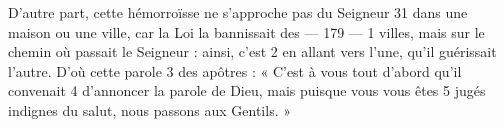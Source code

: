 D'autre part, cette hémorroïsse ne s'approche pas du Seigneur	 
31	 	dans une maison ou une ville, car la Loi la bannissait des	 
 	--- 179 ---	 
1	 	villes, mais sur le chemin où passait le Seigneur : ainsi, c'est	 
2	 	en allant vers l'une, qu'il guérissait l'autre. D'où cette parole	 
3	 	des apôtres : « C'est à vous tout d'abord qu'il convenait	 
4	 	d'annoncer la parole de Dieu, mais puisque vous vous êtes	 
5	 	jugés indignes du salut, nous passons aux Gentils. »
